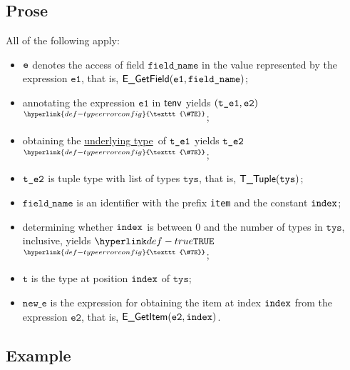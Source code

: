 \documentclass{book}
\newcommand\TypeErrorConfig[0]{\hyperlink{def-typeerrorconfig}{\texttt{\#TE}}}
\newcommand\ProseOrTypeError[0]{\hyperlink{def-proseortypeerror}{$^{\TypeErrorConfig}$}}
\newcommand\underlyingtype[0]{\hyperlink{def-underlyingtype}{underlying type}}
\newcommand\vt[0]{\texttt{t}}
\newcommand\veone[0]{\texttt{e1}}
\newcommand\vetwo[0]{\texttt{e2}}
\newcommand\fieldname[0]{\texttt{field\_name}}
\newcommand\newe[0]{\texttt{new\_e}}
\newcommand\tys[0]{\texttt{tys}}
\begin{document}
\subsection{Prose}
All of the following apply:
\begin{itemize}
  \item $\texttt{e}$ denotes the access of field $\fieldname$ in the value represented by the expression $\veone$, that is, $\EGetField(\veone, \fieldname)$;
  \item annotating the expression $\veone$ in $\textsf{tenv}$ yields $(\vteone, \vetwo)$ \ProseOrTypeError;
  \item obtaining the \underlyingtype\ of $\texttt{t\_e1}$ yields $\texttt{t\_e2}$ \ProseOrTypeError;
  \item $\texttt{t\_e2}$ is tuple type with list of types $\tys$, that is, $\TTuple(\tys)$;
  \item $\fieldname$ is an identifier with the prefix \texttt{item} and the constant $\texttt{index}$;
  \item determining whether $\texttt{index}$ is between $0$ and the number of types in $\tys$, inclusive, yields $\True$ \ProseOrTypeError;
  \item $\vt$ is the type at position $\texttt{index}$ of $\tys$;
  \item $\newe$ is the expression for obtaining the item at index $\texttt{index}$ from the expression $\vetwo$, that is, $\EGetItem(\vetwo, \vindex)$.
\end{itemize}

\subsection{Example}

\end{document}
